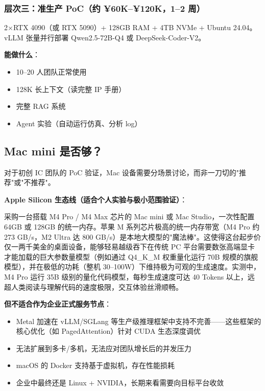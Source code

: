 \documentclass[UTF8,a4paper,10pt,oneside]{ctexart}
\begin{document}
\subsubsection{层次三：准生产 PoC（约 ¥60K--¥120K，1--2 周）}

2$\times$RTX 4090（或 RTX 5090）+ 128GB RAM + 4TB NVMe + Ubuntu 24.04。vLLM 张量并行部署 Qwen2.5-72B-Q4 或 DeepSeek-Coder-V2。

\textbf{能做什么}：
\begin{itemize}
    \item 10--20 人团队正常使用
    \item 128K 长上下文（读完整 IP 手册）
    \item 完整 RAG 系统
    \item Agent 实验（自动运行仿真、分析 log）
\end{itemize}

\subsection{Mac mini 是否够？}

对于初创 IC 团队的 PoC 验证，Mac 设备需要分场景讨论，而非一刀切的"推荐"或"不推荐"。

\textbf{Apple Silicon 生态线（适合个人实验与极小范围验证）}：

采购一台搭载 M4 Pro / M4 Max 芯片的 Mac mini 或 Mac Studio，一次性配置 64GB 或 128GB 的统一内存。苹果 M 系列芯片极高的统一内存带宽（M4 Pro 约 273 GB/s，M2 Ultra 达 800 GB/s）是本地大模型的"魔法棒"。这使得这台起步价仅一两千美金的桌面设备，能够轻易越级吞下在传统 PC 平台需要数张高端显卡才能加载的巨大参数量模型（例如通过 Q4\_K\_M 权重量化运行 70B 规模的旗舰模型），并在极低的功耗（整机 30--100W）下维持极为可观的生成速度。实测中，M4 Pro 运行 35B 级别的量化代码模型，每秒生成速度可达 40 Tokens 以上，远超人类阅读与理解代码的速度极限，交互体验丝滑顺畅。

\textbf{但不适合作为企业正式服务节点}：
\begin{itemize}
    \item Metal 加速在 vLLM/SGLang 等生产级推理框架中支持不完善——这些框架的核心优化（如 PagedAttention）针对 CUDA 生态深度调优
    \item 无法扩展到多卡/多机，无法应对团队增长后的并发压力
    \item macOS 的 Docker 支持基于虚拟机，存在性能损耗
    \item 企业中最终还是 Linux + NVIDIA，长期来看需要向目标平台收敛
\end{itemize}
\end{document}
